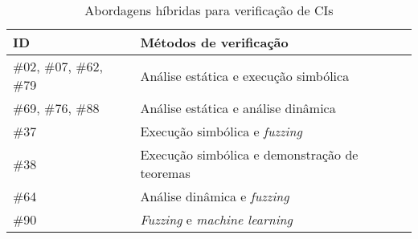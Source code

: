 \begin{table}[!ht]
\centering
\fontsize{8pt}{8pt}\selectfont
\caption{Abordagens híbridas para verificação de CIs}
\label{tab:rq1-hibridas}
\begin{tabular}{@{}ll@{}}
\toprule
\textbf{ID}            & \textbf{Métodos de verificação}               \\ \midrule
\#02, \#07, \#62, \#79 & Análise estática e execução simbólica         \\
\#69, \#76, \#88       & Análise estática e análise dinâmica           \\
\#37                   & Execução simbólica e \textit{fuzzing}                  \\
\#38                   & Execução simbólica e demonstração de teoremas \\
\#64                   & Análise dinâmica e \textit{fuzzing}                    \\
\#90                   & \textit{Fuzzing} e \textit{machine learning}                    \\ \bottomrule
\end{tabular}
\fdadospesquisa
\end{table}